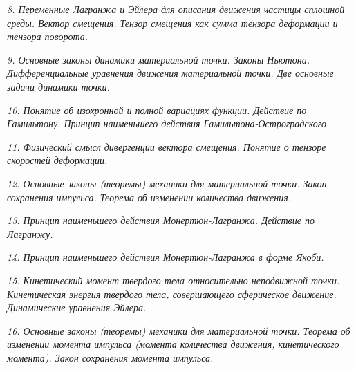 \newpage %

\emph{8. Переменные Лагранжа и Эйлера для описания движения частицы сплошной
среды. Вектор смещения. Тензор смещения как сумма тензора деформации и тензора
поворота.}

\newpage %

\emph{9. Основные законы динамики материальной точки. Законы Ньютона.
Дифференциальные уравнения движения материальной точки. Две основные задачи
динамики точки.}

\newpage %

\emph{10. Понятие об изохронной и полной вариациях функции. Действие по
Гамильтону. Принцип наименьшего действия Гамильтона-Остроградского.}

\newpage %

\emph{11. Физический смысл дивергенции вектора смещения. Понятие о тензоре
скоростей деформации.}

\newpage %

\emph{12. Основные законы (теоремы) механики для материальной точки. Закон
сохранения импульса. Теорема об изменении количества движения.}

\newpage %

\emph{13. Принцип наименьшего действия Монертюн-Лагранжа. Действие по Лагранжу.}

\newpage %

\emph{14. Принцип наименьшего действия Монертюн-Лагранжа в форме Якоби.}

\newpage %

\emph{15. Кинетический момент твердого тела относительно неподвижной точки.
Кинетическая энергия твердого тела, совершающего сферическое движение.
Динамические уравнения Эйлера.}

\newpage %

\emph{16. Основные законы (теоремы) механики для материальной точки. Теорема об
изменении момента импульса (момента количества движения, кинетического
момента). Закон сохранения момента импульса.}

